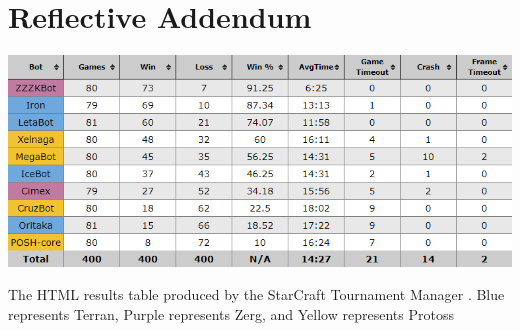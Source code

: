 \documentclass[journal]{IEEEtran}
\begin{document}
\section{Reflective Addendum}

\appendix
\begin{table}[]
	\centering
	\includegraphics[width=\textwidth]{STMResultsWithBot}
	\caption{The HTML results table produced by the StarCraft Tournament Manager \cite{Tournament}. Blue represents Terran, Purple represents Zerg, and Yellow represents Protoss}
	\label{Table2}
\end{table}
\end{document}
